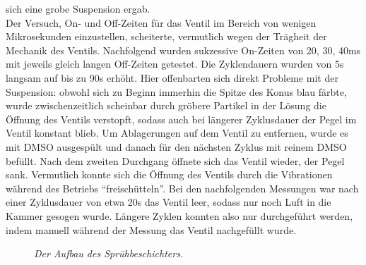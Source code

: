 sich eine grobe Suspension ergab.\\ 
Der Versuch, On- und Off-Zeiten für das Ventil im
Bereich von wenigen Mikrosekunden einzustellen,
scheiterte, vermutlich wegen der Trägheit der Mechanik des
Ventils. Nachfolgend wurden sukzessive
On-Zeiten von 20, 30, 40ms mit jeweils gleich
langen Off-Zeiten getestet. Die Zyklendauern
wurden von 5s langsam auf bis zu 90s erhöht.
Hier offenbarten sich direkt Probleme mit der
Suspension: obwohl sich zu Beginn immerhin die
Spitze des Konus blau färbte, wurde
zwischenzeitlich scheinbar durch gröbere Partikel
in der Lösung die Öffnung des Ventils verstopft,
sodass auch bei längerer Zyklusdauer der Pegel im
Ventil konstant blieb. Um Ablagerungen auf dem
Ventil zu entfernen, wurde es mit DMSO ausgespült
und danach für den nächsten Zyklus mit reinem
DMSO befüllt. Nach dem zweiten Durchgang öffnete
sich das Ventil wieder, der Pegel sank.
Vermutlich konnte sich die Öffnung des Ventils
durch die Vibrationen während des Betriebs
"`freischütteln"'. Bei den nachfolgenden
Messungen war nach einer Zyklusdauer von etwa 20s
das Ventil leer, sodass nur noch Luft in die
Kammer gesogen wurde.
Längere Zyklen konnten also nur durchgeführt
werden, indem manuell während der Messung das
Ventil nachgefüllt wurde.
 
\begin{figure}[H]
	\centering
	\sffamily
	
	\caption{\textit{Der Aufbau des Sprühbeschichters.}}
\label{aufbau}
\end{figure}
 
